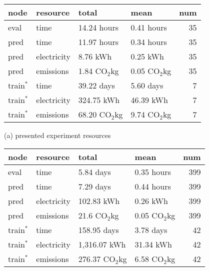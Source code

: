 \documentclass[10pt,twocolumn,letterpaper]{article}
\newcommand{\cotwo}{\ensuremath{\mathrm{CO_2}}}
\begin{document}
\begin{table}[t]
    \centering
\begin{tabular}{llllr}
\toprule
        node & resource    &           total  &           mean &  num \\
\midrule
eval        &        time  & 14.24 hours      & 0.41 hours     &   35 \\
\rule{0pt}{2ex}%
pred        &        time  & 11.97 hours      & 0.34 hours     &   35 \\
pred        & electricity  &  8.76 kWh        & 0.25 kWh       &   35 \\
pred        &   emissions  &  1.84 \cotwo kg  & 0.05 \cotwo kg &   35 \\
\rule{0pt}{2ex}%
train$^{*}$ & time         &  39.22 days      & 5.60 days      &   7 \\
train$^{*}$ & electricity  & 324.75 kWh       & 46.39 kWh      &   7 \\
train$^{*}$ & emissions    &  68.20 \cotwo kg & 9.74 \cotwo kg &   7 \\
\bottomrule
\end{tabular}
(a) presented experiment resources
\begin{tabular}{llllr}
\toprule
        node & resource &           total &            mean &  num \\
\midrule
eval        &        time &    5.84 days     &  0.35 hours    &  399 \\
\rule{0pt}{2ex}%
pred        &        time &    7.29 days     &  0.44 hours    &  399 \\
pred        & electricity &  102.83 kWh      &   0.26 kWh     &  399 \\
pred        &   emissions &  21.6 \cotwo kg  & 0.05 \cotwo kg &  399 \\
\rule{0pt}{2ex}%
train$^{*}$ & time        & 158.95 days      &     3.78 days  &   42 \\
train$^{*}$ & electricity & 1,316.07 kWh     &     31.34 kWh  &   42 \\
train$^{*}$ & emissions   & 276.37 \cotwo kg & 6.58 \cotwo kg &   42 \\

\end{tabular}
\end{table}
\end{document}
